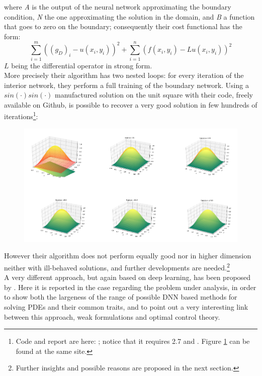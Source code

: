 \documentclass[12pt, a4paper]{report}
\theoremstyle{definition}
\begin{document}
where \textit{A} is the output of the neural network approximating the boundary condition, \textit{N} the one approximating the solution in the domain, and \textit{B} a function that goes to zero on the boundary; consequently their cost functional has the form:
\begin{equation}\label{cost_kailai}
\sum_{i=1}^m\left((g_D)_i - u(x_i,y_i)\right)^2 + \sum_{i=1}^n\left(f(x_i,y_i) - Lu(x_i,y_i)\right)^2
\end{equation}
$L$ being the differential operator in strong form.\\
More precisely their algorithm has two nested loops: for every iteration of the interior network, they perform a full training of the boundary network. Using a $sin(\cdot)sin(\cdot)$ manufactured solution on the unit square with their code, freely available on Github, is possible to recover a very good solution in few hundreds of iterations\footnote{Code and report are here: \cite{Kailai}; notice that it requires \cite{python} 2.7 and \cite{tensorflow}. Figure \ref{pd1} can be found at the same site.}:
\begin{figure}[H]
	\centering
	\includegraphics[width=14cm]{img/pd1.png}
	\caption{}\label{pd1}
\end{figure}
\noindent However their algorithm does not perform equally good nor in higher dimension neither with ill-behaved solutions, and further developments are needed.\footnote{Further insights and possible reasons are proposed in the next section.}\\
\newline \noindent A very different approach, but again based on deep learning, has been proposed by \cite{Weinan}. Here it is reported in the case regarding the problem under analysis, in order to show both the largeness of the range of possible DNN based methods for solving PDEs and their common traits, and to point out a very interesting link between this approach, weak formulations and optimal control theory.\\
\end{document}

